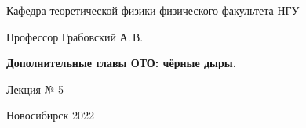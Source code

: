\documentclass[12pt,pagesize,paper=192mm:108mm,landscape]{scrbook}
\begin{document}
\begin{titlepage}
\begin{center}
    Кафедра теоретической физики физического факультета НГУ
    \medskip

    \Large
    Профессор Грабовский А.\,В.
    \smallskip

    \Large
    \textbf{Дополнительные главы ОТО: чёрные дыры.}
    \smallskip

    \Large
    Лекция № 5
    \vfill

    \normalsize
    \vfill

    \normalsize \ccbysa\hspace{0.5em}  Новосибирск 2022
  \end{center}
\end{titlepage}
\end{document}
